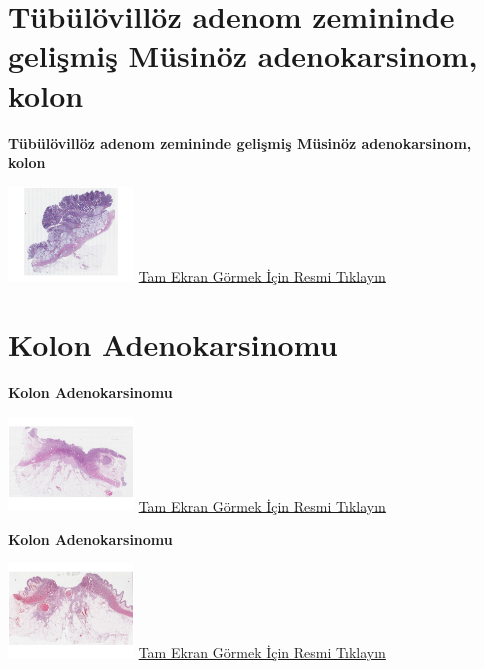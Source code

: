 \documentclass[
  letterpaper,
  DIV=11,
  numbers=noendperiod]{scrreprt}
\begin{document}
\hypertarget{sec-tubulovilloz-adenom-zemininde-adenokarsinom}{%
\chapter{Tübülövillöz adenom zemininde gelişmiş Müsinöz adenokarsinom,
kolon}\label{sec-tubulovilloz-adenom-zemininde-adenokarsinom}}

\textbf{Tübülövillöz adenom zemininde gelişmiş Müsinöz adenokarsinom,
kolon}

\href{https://images.patolojiatlasi.com/mucinous-adenocarcinoma-colon/HE.html}{\includegraphics[width=0.25\textwidth,height=\textheight]{./screenshots/thumbnail_mucinous-adenocarcinoma-colon.png}}
\href{https://images.patolojiatlasi.com/mucinous-adenocarcinoma-colon/HE.html}{Tam
Ekran Görmek İçin Resmi Tıklayın}

\hypertarget{sec-kolon-adenokarsinomu}{%
\chapter{Kolon Adenokarsinomu}\label{sec-kolon-adenokarsinomu}}

\textbf{Kolon Adenokarsinomu}

\href{https://images.patolojiatlasi.com/colon-adenocarcinoma/HE.html}{\includegraphics[width=0.25\textwidth,height=\textheight]{./screenshots/thumbnail_colon-adenocarcinoma-1.png}}
\href{https://images.patolojiatlasi.com/colon-adenocarcinoma/HE.html}{Tam
Ekran Görmek İçin Resmi Tıklayın}

\textbf{Kolon Adenokarsinomu}

\href{https://images.patolojiatlasi.com/colon-adenocarcinoma/HE2.html}{\includegraphics[width=0.25\textwidth,height=\textheight]{./screenshots/thumbnail_colon-adenocarcinoma-2.png}}
\href{https://images.patolojiatlasi.com/colon-adenocarcinoma/HE2.html}{Tam
Ekran Görmek İçin Resmi Tıklayın}
\end{document}
